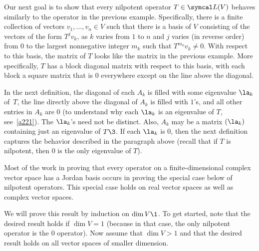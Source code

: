 Our next goal is to show that every nilpotent operator $T \in \L(V)$ behaves similarly to the operator in the previous example. Specifically, there is a finite collection of vectors $v_1, \dots, v_n \in V$ such that there is a basis of $V$ consisting of the vectors of the form $T^j v_k$, as $k$ varies from $1$ to $n$ and $j$ varies (in reverse order) from $0$ to the largest nonnegative integer $m_k$ such that $T^{m_k} v_k \ne 0$. With respect to this basis, the matrix of $T$ looks like the matrix in the previous example. More specifically, $T$ has a block diagonal matrix with respect to this basis, with each block a square matrix that is $0$ everywhere except on the line above the diagonal.

In the next definition, the diagonal of each $A_k$ is filled with some eigenvalue $\la_k$ of~$T$, the line directly above the diagonal of $A_k$ is filled with $1$'s, and all other entries in $A_k$ are $0$ (to understand why each $\la_k$ is an eigenvalue of $T$, see~\ref{a221}). The $\la_k$'s need not be distinct. Also, $A_k$ may be a  matrix $(\la_k)$ containing just an eigenvalue of $T\3$. If each $\la_k$ is $0$, then the next definition captures the behavior described in the paragraph above (recall that if $T$ is nilpotent, then $0$ is the only eigenvalue of $T$).


Most of the work in proving that every operator on a finite-dimensional complex vector space has a Jordan basis occurs in proving the special case below of nilpotent operators. This special case holds on real vector spaces as well as complex vector spaces.


\proof
We will prove this result by induction on $\dim V\1$. To get started, note that the desired result holds if $\dim V = 1$ (because in that case, the only nilpotent operator is the $0$ operator). Now assume that $\dim V > 1$ and that the desired result holds on all vector spaces of smaller dimension.


